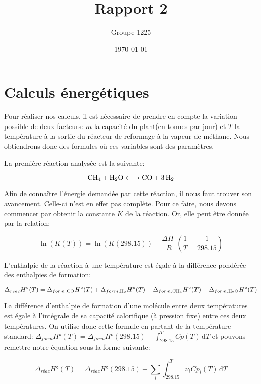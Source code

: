 \documentclass[a4paper, oneside, 12pt]{article}
\title{Rapport 2}
\author{Groupe 1225}
\date{\today}
\begin{document}
\maketitle


\section{Calculs énergétiques}

Pour réaliser nos calculs, il est nécessaire de prendre 
en compte la variation possible de 
deux facteurs: $m$ la capacité du plant(en tonnes par jour) 
et $T$ la température à la sortie du
réacteur de reformage à la vapeur de méthane.
Nous obtiendrons donc des formules où ces variables sont des paramètres.

La première réaction analysée est la suivante:

\begin{equation*}
	\ce{CH4 + H2O <-> CO + 3H2}
\end{equation*}

Afin de connaître l'énergie demandée par cette réaction,
il nous faut trouver son avancement. Celle-ci n'est en effet pas complète.
Pour ce faire, nous devons commencer par obtenir la constante $K$ 
de la réaction. Or, elle peut être donnée par la relation:

\begin{equation}
	\ln{(K(T))} = \ln{(K(298.15))} - 
	\frac{\Delta H^{\circ}}{R}(\frac{1}{T} - \frac{1}{298.15})
\end{equation}

L'enthalpie de la réaction à une température est égale 
à la différence pondérée des enthalpies de formation:

\begin{equation}
	\Delta_{reac} H^{\circ} (T)= \Delta_{form,\ce{CO}} H^{\circ}(T)
	+\Delta_{form, \ce{H2}} H^{\circ} (T) - \Delta_{form, \ce{CH4}} H^{\circ} (T) 
	-\Delta_{form, \ce{H2O}} H^{\circ} (T)
\end{equation}

La différence d'enthalpie de formation d'une molécule entre deux 
températures est égale à l'intégrale de sa capacité calorifique 
(à pression fixe) entre ces deux températures.
On utilise donc cette formule en partant de la  température standard: $\Delta_{form}H°(T)= \Delta_{form}H°(298.15)+\int_298.15^T Cp(T) \, \mathrm dT$ et pouvons remettre notre équation sous la forme suivante:

\begin{equation}
	\Delta_{réac}H°(T)=\Delta_{réac}H°(298.15)+\sum_i \int_{298.15}^T \nu_i Cp_i(T) \, \mathrm dT
\end{equation}
\end{document}
